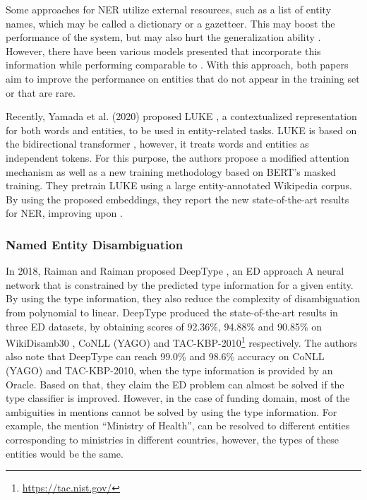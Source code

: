 \documentclass{report}
\theoremstyle{definition}
\theoremstyle{remark}
\begin{document}
Some approaches for NER utilize external resources, such as a list of entity names, which may be called a dictionary or a gazetteer. This may boost the performance of the system, but may also hurt the generalization ability \cite{NERsurvey}. However, there have been various models presented \cite{NERgazetteer, NERDict} that incorporate this information while performing comparable to \cite{flairpaper}. With this approach, both papers \cite{NERgazetteer, NERDict} aim to improve the performance on entities that do not appear in the training set or that are rare. 

Recently, Yamada et al. (2020) proposed LUKE \cite{LUKE}, a contextualized representation for both words and entities, to be used in entity-related tasks. LUKE is based on the bidirectional transformer \cite{transformer}, however, it treats words and entities as independent tokens. For this purpose, the authors propose a modified attention mechanism as well as a new training methodology based on BERT's \cite{BERT} masked training. They pretrain LUKE using a large entity-annotated Wikipedia corpus. By using the proposed embeddings, they report the new state-of-the-art results for NER, improving upon \cite{flairpaper}.

\subsubsection{Named Entity Disambiguation}

In 2018, Raiman and Raiman proposed DeepType \cite{raiman}, an ED approach A neural network that is constrained by the predicted type information for a given entity. By using the type information, they also reduce the complexity of disambiguation from polynomial to linear. DeepType produced the state-of-the-art results in three ED datasets, by obtaining scores of 92.36\%, 94.88\% and 90.85\% on WikiDisamb30 \cite{wikidisamb}, CoNLL (YAGO) \cite{CoNLLYago} and TAC-KBP-2010\footnote{\url{https://tac.nist.gov/}} respectively. The authors also note that DeepType can reach 99.0\% and 98.6\% accuracy on CoNLL (YAGO) and TAC-KBP-2010, when the type information is provided by an Oracle. Based on that, they claim the ED problem can almost be solved if the type classifier is improved. However, in the case of funding domain, most of the ambiguities in mentions cannot be solved by using the type information. For example, the mention ``Ministry of Health'', can be resolved to different entities corresponding to ministries in different countries, however,  the types of these entities would be the same.
\end{document}
